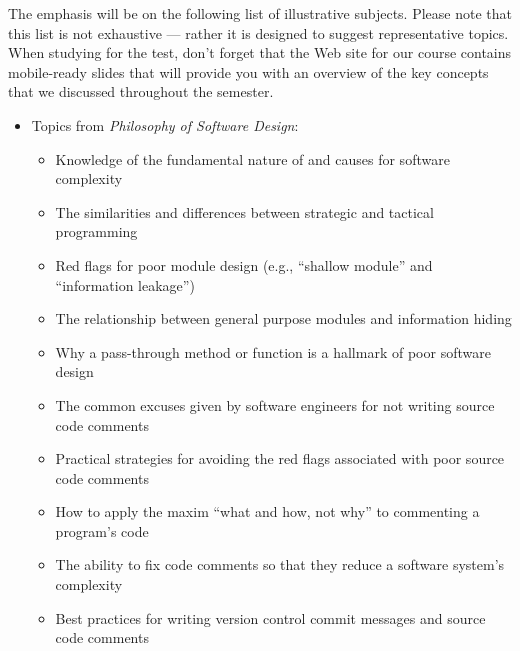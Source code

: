 \documentclass[11pt]{article}
\newcommand{\philosophy}{{\em Philosophy of Software Design\/}}
\begin{document}
The emphasis will be on the following list of illustrative subjects. Please note
that this list is not exhaustive --- rather it is designed to suggest
representative topics.
%
When studying for the test, don't forget that the Web site for our course
contains mobile-ready slides that will provide you with an overview of the key
concepts that we discussed throughout the semester.

\vspace*{-.05in}
\begin{itemize}

  \itemsep 0.05in

  \item Topics from \philosophy{}:
    \vspace*{-.05in}
    \begin{itemize}

      \itemsep 0.05in

      \item Knowledge of the fundamental nature of and causes for software
        complexity

      \item The similarities and differences between strategic and tactical
        programming

      \item Red flags for poor module design (e.g., ``shallow module'' and
        ``information leakage'')

      \item The relationship between general purpose modules and information
        hiding

      \item Why a pass-through method or function is a hallmark of poor software design

      \item The common excuses given by software engineers for not writing
        source code comments

      \item Practical strategies for avoiding the red flags associated with poor
        source code comments

      \item How to apply the maxim ``what and how, not why'' to commenting a
        program's code

      \item The ability to fix code comments so that they reduce a software
        system's complexity

      \item Best practices for writing version control commit messages and source code comments


\end{itemize}
\end{itemize}
\end{document}
